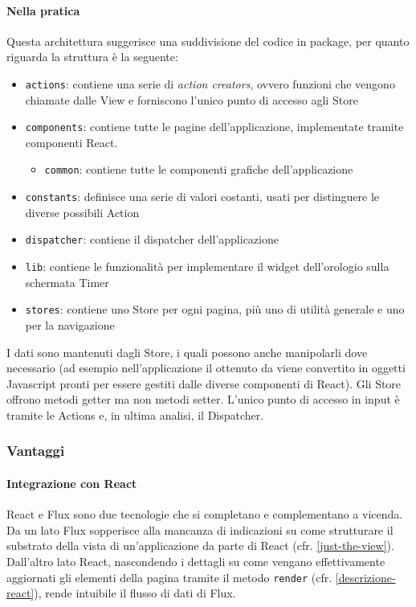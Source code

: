 \paragraph{Nella pratica}
Questa architettura suggerisce una suddivisione del codice in package, per quanto riguarda
\fiscoloMobile{} la struttura è la seguente:

\begin{itemize}
\item \texttt{actions}: contiene una serie di \textit{action creators}, ovvero funzioni
che vengono chiamate dalle View e forniscono l'unico punto di accesso agli Store
\item \texttt{components}: contiene tutte le pagine dell'applicazione, implementate tramite
componenti React.
	\begin{itemize}
	\item \texttt{common}: contiene tutte le componenti grafiche dell'applicazione
	\end{itemize}
\item \texttt{constants}: definisce una serie di valori costanti, usati per distinguere
le diverse possibili Action
\item \texttt{dispatcher}: contiene il dispatcher dell'applicazione
\item \texttt{lib}: contiene le funzionalità per implementare il widget dell'orologio sulla schermata Timer
\item \texttt{stores}: contiene uno Store per ogni pagina, più uno di utilità generale e uno
per la navigazione
\end{itemize}

I dati sono mantenuti dagli Store, i quali possono anche manipolarli dove necessario (ad
esempio nell'applicazione il  ottenuto da \fiscoloWeb{} viene convertito in oggetti
Javascript pronti per essere gestiti dalle diverse componenti di React). Gli Store offrono
metodi getter ma non metodi setter. L'unico punto di accesso in input è tramite le Actions
e, in ultima analisi, il Dispatcher.

\subsubsection{Vantaggi}

\paragraph{Integrazione con React}
React e Flux sono due tecnologie che si completano e complementano a vicenda. Da un lato
Flux sopperisce alla mancanza di indicazioni su come strutturare il substrato della vista
di un'applicazione da parte di React (cfr. \ref{just-the-view}). Dall'altro lato React,
nascondendo i dettagli su come vengano effettivamente aggiornati gli elementi della pagina
tramite il metodo \texttt{render} (cfr. \ref{descrizione-react}), rende intuibile il flusso
di dati di Flux.

